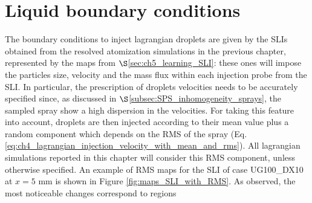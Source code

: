 \section{Liquid boundary conditions}
\label{sec:JICf_LGS_liquid_BCs}

The boundary conditions to inject lagrangian droplets are given by the SLIs obtained from the resolved atomization simulations in the previous chapter, represented by the maps from $\S$\ref{sec:ch5_learning_SLI}: these ones will impose the particles size, velocity and the mass flux within each injection probe from the SLI. In particular, the prescription of droplets velocities needs to be accurately specified since, as discussed in $\S$\ref{subsec:SPS_inhomogeneity_sprays}, the sampled spray show a high dispersion in the velocities. For taking this feature into account, droplets are then injected according to their mean value plus a random component which depends on the RMS of the spray (Eq. \ref{eq:ch4_lagrangian_injection_velocity_with_mean_and_rms}).  All lagrangian simulations reported in this chapter will consider this RMS component, unless otherwise specified. An example of RMS maps for the SLI of case UG100\_DX10 at $x = 5$ mm is shown in Figure \ref{fig:maps_SLI_with_RMS}. As observed, the most noticeable changes correspond to regions 

